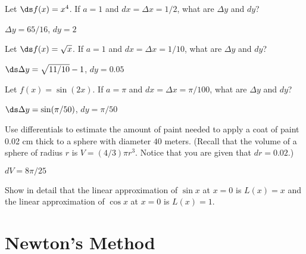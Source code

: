 \begin{exercises}

\begin{exercise} Let $\ds f(x) = x^4$. If $a=1$ and $dx= \Delta x =1/2$, 
what are $\Delta y$ and $dy$?
\begin{answer} $\Delta y=65/16$, $dy=2$
\end{answer}\end{exercise}

\begin{exercise} Let $\ds f(x) = \sqrt{x}$. If $a=1$ and $dx= \Delta x
=1/10$, what are $\Delta y$ and $dy$?
\begin{answer} $\ds \Delta y=\sqrt{11/10}-1$, $dy=0.05$
\end{answer}\end{exercise}


\begin{exercise} Let $f(x) = \sin (2x)$. If $a=\pi$ and $dx= \Delta x
=\pi/100$, what are $\Delta y$ and $dy$?
\begin{answer} $\ds \Delta y=\sin(\pi/50)$, $dy=\pi/50$
\end{answer}\end{exercise}

\begin{exercise} Use differentials to estimate the amount of paint needed to
 apply a coat of paint 0.02 cm thick to a sphere with diameter $40$
 meters. (Recall that the volume of a sphere of radius $r$ is $V
 =(4/3)\pi r^3$. Notice that you are given that $dr=0.02$.)
\begin{answer} $dV=8\pi/25$
\end{answer}\end{exercise}

\begin{exercise} Show in detail that the linear approximation of
 $\sin x$ at $x=0$ is $L(x)=x$ and the linear approximation of $\cos x$
 at $x=0$ is $L(x)=1$.
\end{exercise}
\end{exercises}














\section{Newton's Method}

